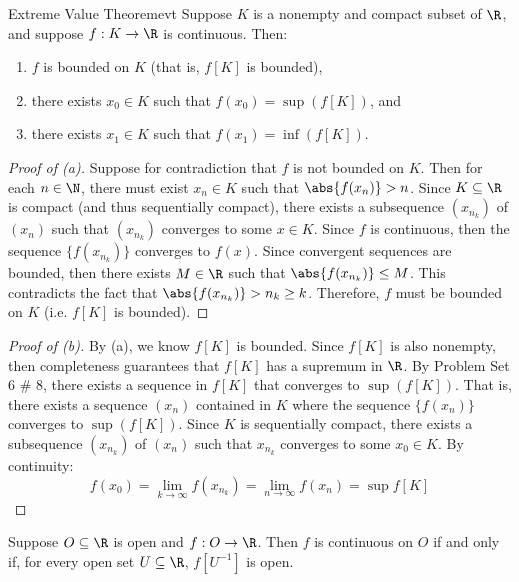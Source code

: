 \begin{thmbox}{Extreme Value Theorem}{evt}
    Suppose $K$ is a nonempty and compact subset of $\R$, and suppose $f : K \to \R$ is continuous. Then:
    \begin{enumerate}[label=(\alph*)]
        \item $f$ is bounded on $K$ (that is, $f[K]$ is bounded),
        \item there exists $x_0 \in K$ such that $f(x_0) = \sup( f[K] )$, and
        \item there exists $x_1 \in K$ such that $f(x_1) = \inf( f[K] )$.
    \end{enumerate}
    \tcblower
    \begin{proof}[Proof of (a)]
        Suppose for contradiction that $f$ is not bounded on $K$. Then for each $n \in \N$, there must exist $x_n \in K$ such that $\abs{f(x_n)} > n$. Since $K \subseteq \R$ is compact (and thus sequentially compact), there exists a subsequence $(x_{n_k})$ of $(x_n)$ such that $(x_{n_k})$ converges to some $x \in K$. Since $f$ is continuous, then the sequence $\{ f(x_{n_k}) \}$ converges to $f(x)$. Since convergent sequences are bounded, then there exists $M \in \R$ such that $\abs{f(x_{n_k})} \leq M$. This contradicts the fact that $\abs{f(x_{n_k})} > n_k \geq k$. Therefore, $f$ must be bounded on $K$ (i.e. $f[K]$ is bounded).
    \end{proof}

    \begin{proof}[Proof of (b)]
        By (a), we know $f[K]$ is bounded. Since $f[K]$ is also nonempty, then completeness guarantees that $f[K]$ has a supremum in $\R$. By Problem Set 6 \# 8, there exists a sequence in $f[K]$ that converges to $\sup(f[K])$. That is, there exists a sequence $(x_n)$ contained in $K$ where the sequence $\{ f(x_n) \}$ converges to $\sup(f[K])$. Since $K$ is sequentially compact, there exists a subsequence $(x_{n_k})$ of $(x_n)$ such that $x_{n_k}$ converges to some $x_0 \in K$. By continuity:
        \[ f(x_0) = \lim_{k \to \infty} f(x_{n_k}) = \lim_{n \to \infty} f(x_n) = \sup f[K] \]
    \end{proof}
\end{thmbox}



\begin{thmbox}{}{}
    Suppose $O \subseteq \R$ is open and $f : O \to \R$. Then $f$ is continuous on $O$ if and only if, for every open set $U \subseteq \R$, $f[U^{-1}]$ is open.
\end{thmbox}

